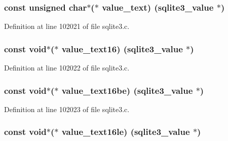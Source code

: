 \subsubsection[{value\+\_\+text}]{\setlength{\rightskip}{0pt plus 5cm}const unsigned char$\ast$($\ast$ value\+\_\+text) (sqlite3\+\_\+value $\ast$)}\label{structsqlite3__api__routines_a5e6ca1b3e3e55d39699bad63c21138a3}


Definition at line 102021 of file sqlite3.\+c.

\hypertarget{structsqlite3__api__routines_a10348e6f3c2009240752cad262ec5226}{}
\subsubsection[{value\+\_\+text16}]{\setlength{\rightskip}{0pt plus 5cm}const void$\ast$($\ast$ value\+\_\+text16) (sqlite3\+\_\+value $\ast$)}\label{structsqlite3__api__routines_a10348e6f3c2009240752cad262ec5226}


Definition at line 102022 of file sqlite3.\+c.

\hypertarget{structsqlite3__api__routines_a2d7b7d52b459c02632b8df2de00bf595}{}
\subsubsection[{value\+\_\+text16be}]{\setlength{\rightskip}{0pt plus 5cm}const void$\ast$($\ast$ value\+\_\+text16be) (sqlite3\+\_\+value $\ast$)}\label{structsqlite3__api__routines_a2d7b7d52b459c02632b8df2de00bf595}


Definition at line 102023 of file sqlite3.\+c.

\hypertarget{structsqlite3__api__routines_a2bf569f598d827c577bcbbb36e9a815b}{}
\subsubsection[{value\+\_\+text16le}]{\setlength{\rightskip}{0pt plus 5cm}const void$\ast$($\ast$ value\+\_\+text16le) (sqlite3\+\_\+value $\ast$)}\label{structsqlite3__api__routines_a2bf569f598d827c577bcbbb36e9a815b}


